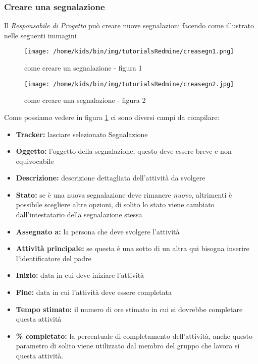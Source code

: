 \documentclass{scalatekids-article}
\begin{document}
\subsubsection{Creare una segnalazione}
Il \textit{Responsabile di Progetto} può creare nuove segnalazioni facendo come illustrato nelle seguenti immagini
\begin{figure}[H]
  \centering
  \texttt{[image: /home/kids/bin/img/tutorialsRedmine/creasegn1.png]}
  \caption{come creare un segnalazione - figura 1}
\end{figure}
\begin{figure}[H]
  \centering
  \texttt{[image: /home/kids/bin/img/tutorialsRedmine/creasegn2.jpg]}
  \caption{come creare una segnalazione - figura 2\label{fig:crea-segnalazione-2}}
\end{figure}
Come possiamo vedere in figura \ref{fig:crea-segnalazione-2} ci sono diversi campi da compilare:
\begin{itemize}
  \item \textbf{Tracker:} lasciare selezionato Segnalazione
  \item \textbf{Oggetto:} l'oggetto della segnalazione, questo deve essere breve e non equivocabile
  \item \textbf{Descrizione:} descrizione dettagliata dell'attività da svolgere
  \item \textbf{Stato:} se è una nuova segnalazione deve rimanere \textit{nuovo}, altrimenti è possibile scegliere altre opzioni, di solito lo stato viene cambiato dall'intestatario della segnalazione stessa
  \item \textbf{Assegnato a:} la persona che deve svolgere l'attività
  \item \textbf{Attività principale:} se questa è una sotto  di un altra qui bisogna inserire l'identificatore del  padre
  \item \textbf{Inizio:} data in cui deve iniziare l'attività
  \item \textbf{Fine:} data in cui l'attività deve essere completata
  \item \textbf{Tempo stimato:} il numero di ore stimato in cui si dovrebbe completare questa attività
  \item \textbf{\% completato:} la percentuale di completamento dell'attività, anche questo parametro di solito viene utilizzato dal membro del gruppo che lavora si questa attività.
\end{itemize}
\end{document}
